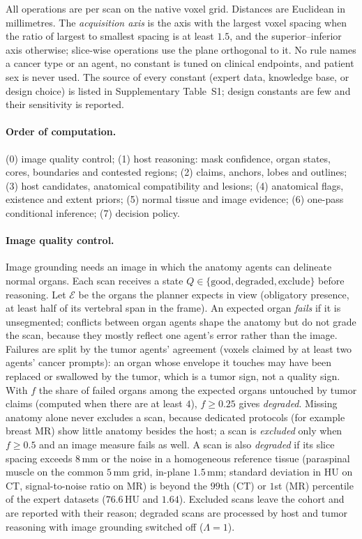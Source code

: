 \documentclass[fleqn,10pt]{olplainarticle}
\begin{document}
All operations are per scan on the native voxel grid. Distances are Euclidean in millimetres. The \emph{acquisition axis}
is the axis with the largest voxel spacing when the ratio of largest to smallest spacing is at least $1.5$, and the
superior--inferior axis otherwise; slice-wise operations use the plane orthogonal to it. No rule names a cancer type or an
agent, no constant is tuned on clinical endpoints, and patient sex is never used. The source of every constant (expert
data, knowledge base, or design choice) is listed in Supplementary Table~S1; design constants are few and their
sensitivity is reported.

\paragraph{Order of computation.} (0) image quality control; (1) host reasoning: mask confidence, organ states, cores,
boundaries and contested regions; (2) claims, anchors, lobes and outlines; (3) host candidates, anatomical compatibility
and lesions; (4) anatomical flags, existence and extent priors; (5) normal tissue and image evidence; (6) one-pass
conditional inference; (7) decision policy.

\paragraph{Image quality control.}
\label{sec:qc_details}
Image grounding needs an image in which the anatomy agents can delineate normal organs. Each scan receives a state
$Q\in\{\text{good},\text{degraded},\text{exclude}\}$ before reasoning. Let $\mathcal{E}$ be the organs the planner expects in
view (obligatory presence, at least half of its vertebral span in the frame). An expected organ \emph{fails} if it is
unsegmented; conflicts between organ agents shape the anatomy but do not grade the scan, because they mostly
reflect one agent's error rather than the image. Failures are split by the tumor agents' agreement (voxels claimed by at
least two agents' cancer prompts): an organ whose envelope it touches may have been replaced or swallowed by the tumor,
which is a tumor sign, not a quality sign. With $f$ the share of failed organs among the
expected organs untouched by tumor claims (computed when there are at least $4$), $f\ge0.25$ gives \emph{degraded}. Missing
anatomy alone never excludes a scan, because dedicated protocols (for example breast MR) show little anatomy besides the
host; a scan is \emph{excluded} only when $f\ge0.5$ and an image measure fails as well. A scan is also \emph{degraded} if its slice spacing exceeds $8$\,mm or the noise in a
homogeneous reference tissue (paraspinal muscle on the common $5$\,mm grid, in-plane $1.5$\,mm; standard deviation in HU on
CT, signal-to-noise ratio on MR) is beyond the $99$th (CT) or $1$st (MR) percentile of the expert datasets
($76.6$\,HU and $1.64$). Excluded scans leave the cohort and are reported with their reason; degraded scans
are processed by host and tumor reasoning with image grounding switched off ($\Lambda=1$).
\end{document}
